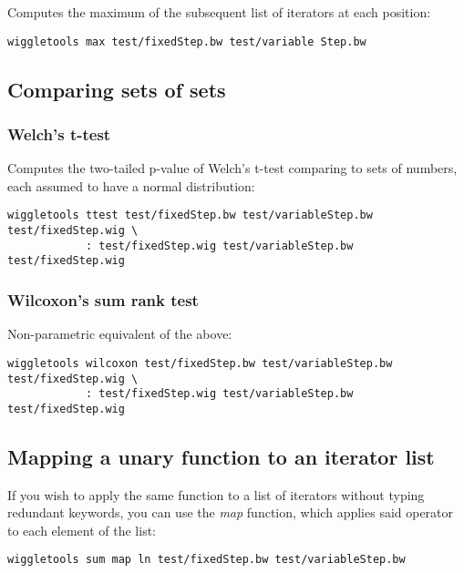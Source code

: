 \documentclass[12pt]{article}
\begin{document}
Computes the maximum of the subsequent list of iterators at each position:

\begin{verbatim}
wiggletools max test/fixedStep.bw test/variable Step.bw 
\end{verbatim}

\subsection{Comparing sets of sets}

\subsubsection{Welch's t-test}

Computes the two-tailed p-value of Welch's t-test comparing to sets of numbers, each assumed to have a normal distribution:

\begin{verbatim}
wiggletools ttest test/fixedStep.bw test/variableStep.bw test/fixedStep.wig \
            : test/fixedStep.wig test/variableStep.bw test/fixedStep.wig
\end{verbatim}

\subsubsection{Wilcoxon's sum rank test}

Non-parametric equivalent of the above:

\begin{verbatim}
wiggletools wilcoxon test/fixedStep.bw test/variableStep.bw test/fixedStep.wig \
            : test/fixedStep.wig test/variableStep.bw test/fixedStep.wig
\end{verbatim}

\subsection{Mapping a unary function to an iterator list}

If you wish to apply the same function to a list of iterators without typing redundant keywords, you can use the \emph{map} function, which applies said operator to each element of the list:

\begin{verbatim}
wiggletools sum map ln test/fixedStep.bw test/variableStep.bw
\end{verbatim}
\end{document}
